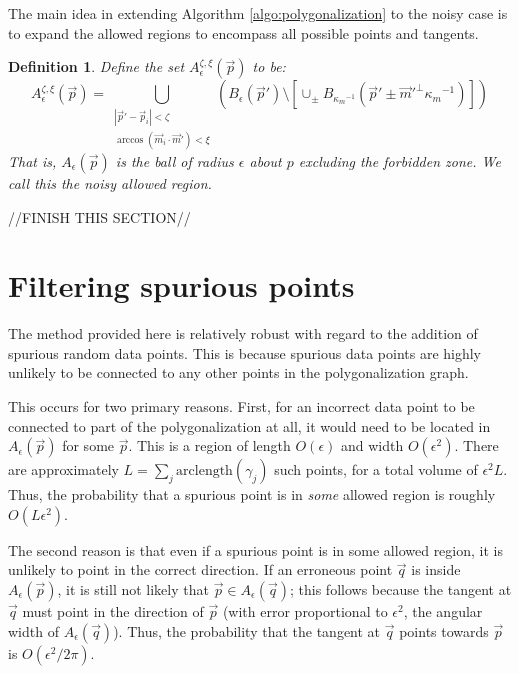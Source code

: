 \documentclass{article}
\newtheorem{definition}[cntr]{Definition}
\numberwithin{cntr}{section}
\numberwithin{equation}{section}
\newcommand{\abs}[1]{\left| #1 \right|}%
\newcommand{\vp}[0]{{\vec{p}}}
\newcommand{\vq}[0]{{\vec{q}}}
\newcommand{\vm}[0]{{\vec{m}}}
\newcommand{\ball}[2]{ { B_{#1}(#2) } }
\newcommand{\allowed}[2]{ { A_{#1}(#2) } }
\newcommand{\curvemax}{{\kappa_{m}}}
\newcommand{\curvemaxi}{{\curvemax^{-1}}}
\newcommand{\pointNoise}{{\zeta}}
\newcommand{\tanNoise}{{\xi}}
\newcommand{\nallowed}[2]{ { A^{\pointNoise, \tanNoise}_{#1}(#2) } }
\begin{document}
The main idea in extending Algorithm \ref{algo:polygonalization} to the noisy case is to expand the allowed regions to encompass all possible points and tangents.

\begin{definition}
  \label{def:AllowedRegionNoisy}
  Define the set $\nallowed{\epsilon}{\vp}$ to be:
  \begin{equation}
    \label{eq:allowedRegionNoisy}
    \nallowed{\epsilon}{\vp}= \bigcup_{
      \substack{
        \abs{\vp'-\vp_{i}} < \pointNoise\\
        \arccos(\vm_{i} \cdot \vm') < \tanNoise
      }
    }
    \left(
      \ball{\epsilon}{\vp'} \setminus \left[ \cup_{\pm} \ball{\curvemaxi}{\vp' \pm \vm'^{\perp} \curvemaxi} \right]
    \right)
  \end{equation}
  That is, $\allowed{\epsilon}{\vp}$ is the ball of radius $\epsilon$ about $p$ excluding the forbidden zone.  We call this the \emph{noisy allowed region}.
\end{definition}

//FINISH THIS SECTION//

\section{Filtering spurious points}

The method provided here is relatively robust with regard to the addition of spurious random data points. This is because spurious data points are highly unlikely to be connected to any other points in the polygonalization graph.

This occurs for two primary reasons. First, for an incorrect data point to be connected to part of the polygonalization at all, it would need to be located in $\allowed{\epsilon}{\vp}$ for some $\vp$. This is a region of length $O(\epsilon)$ and width $O(\epsilon^{2})$. There are approximately $L = \sum_{j} \textrm{arclength}(\gamma_{j})$ such points, for a total volume of $\epsilon^{2} L$. Thus, the probability that a spurious point is in \emph{some} allowed region is roughly $O(L \epsilon^{2})$.

The second reason is that even if a spurious point is in some allowed region, it is unlikely to point in the correct direction. If an erroneous point $\vq$ is inside $\allowed{\epsilon}{\vp}$, it is still not likely that $\vp \in \allowed{\epsilon}{\vq}$; this follows because the tangent at $\vq$ must point in the direction of $\vp$ (with error proportional to $\epsilon^{2}$, the angular width of $\allowed{\epsilon}{\vq}$). Thus, the probability that the tangent at $\vq$ points towards $\vp$ is $O(\epsilon^{2}/2\pi)$.
\end{document}
